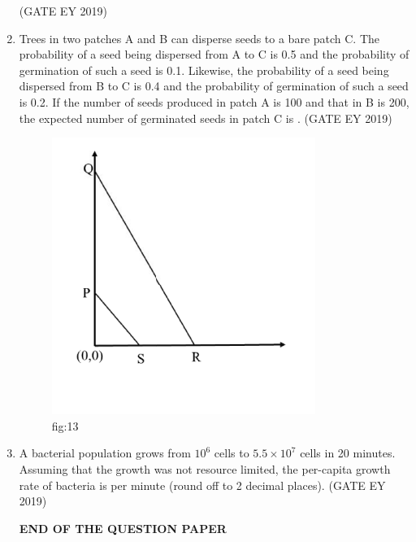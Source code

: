 \documentclass[journal,12pt,onecolumn]{IEEEtran}
\theoremstyle{remark}
\begin{document}
\begin{enumerate}[resume]
\hfill{(GATE EY 2019)}
\item Trees in two patches A and B can disperse seeds to a bare patch C. The probability of a seed being dispersed from A to C is 0.5 and the probability of germination of such a seed is 0.1. Likewise, the probability of a seed being dispersed from B to C is 0.4 and the probability of germination of such a seed is 0.2. If the number of seeds produced in patch A is 100 and that in B is 200, the expected number of germinated seeds in patch C is \underline{\hspace{1.5cm}}.
\hfill{(GATE EY 2019)}
\begin{figure}[H]
    \centering
    \includegraphics[]{figs/53.png}
    \caption{fig:13}
    \label{}
\end{figure}

\item A bacterial population grows from $10^6$ cells to $5.5 \times 10^7$ cells in 20 minutes. Assuming that the growth was not resource limited, the per-capita growth rate of bacteria is \underline{\hspace{1.5cm}}per minute (round off to 2 decimal places).
\hfill{(GATE EY 2019)}

\begin{center}
    \textbf{END OF THE QUESTION PAPER}
\end{center}
\end{enumerate}
\end{document}
